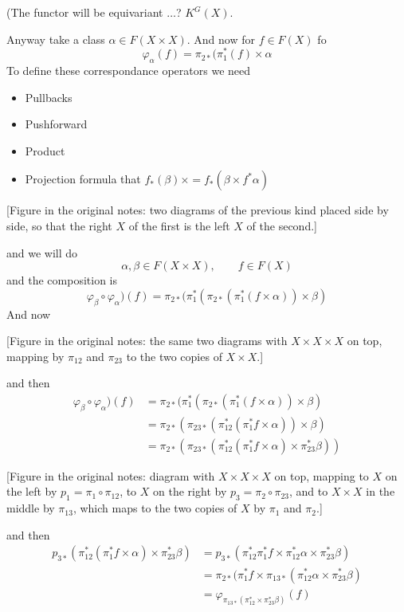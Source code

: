 (The functor will be equivariant $\ldots$?
$K^G(X)$.

Anyway take a class $\alpha \in F(X\times
X)$. And now for $f\in F(X)$ fo
$$\varphi_\alpha(f)=\pi_{2*}(\pi_1^*(f)\times
\alpha$$
To define these correspondance operators we
need
\begin{itemize}
\item Pullbacks
\item Pushforward
\item Product
\item Projection formula that
$f_*(\beta)\times =f_*(\beta\times
f^*\alpha)$
\end{itemize}

\medskip{}

[Figure in the original notes: two diagrams
of the previous kind placed side by side, so
that the right $X$ of the first is the left
$X$ of the second.]

and we will do
$$\alpha,\beta \in F(X\times X),\qquad  f\in
F(X)$$
and the composition is
$$\varphi_\beta\circ
\varphi_\alpha)(f)=\pi_{2*}(\pi_1^*
(\pi_{2*}(\pi_1^*(f\times \alpha))\times
\beta)$$
And now

[Figure in the original notes: the same two
diagrams with $X\times X\times X$ on top,
mapping by $\pi_{12}$ and $\pi_{23}$ to the
two copies of $X\times X$.]

and then
$$
\begin{aligned}
\varphi_\beta\circ
\varphi_\alpha)(f)&=\pi_{2*}(\pi_1^*
(\pi_{2*}(\pi_1^*(f\times \alpha))\times
\beta)\\
&=\pi_{2*}(\pi_{23*}(\pi_{12}
^*(\pi_1^*f\times
\alpha))\times \beta)\\
&=\pi_{2*}(\pi_{23*}(\pi^*_{12}
(\pi_1^*f\times
\alpha)\times \pi_{23}^*\beta))
\end{aligned}
$$

[Figure in the original notes: diagram with
$X\times X\times X$ on top, mapping to $X$ on
the left by $p_1=\pi_1\circ \pi_{12}$, to $X$
on the right by $p_3=\pi_2\circ \pi_{23}$,
and to $X\times X$ in the middle by
$\pi_{13}$, which maps to the two copies of
$X$ by $\pi_1$ and $\pi_2$.]

and then
$$
\begin{aligned}
p_{3*}(\pi_{12}^* (\pi_1^* f\times
\alpha)\times
\pi_{23}^*\beta)&=p_{3*}(\pi_{12}^*\pi_1^*
f\times \pi_{12}^*\alpha\times
\pi_{23}^*\beta)\\
&=\pi_{2*}(\pi_1^* f\times \pi_{13*}
(\pi_{12}^*\alpha\times \pi_{23}^*\beta)\\
&=\varphi_{\pi_{13*}(\pi_{12}^*\times
\pi_{23}^*\beta)}(f)
\end{aligned}
$$

